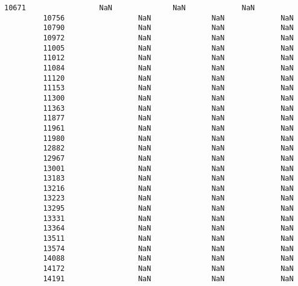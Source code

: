 \documentclass[11pt]{article}
\begin{document}
\begin{Verbatim}[commandchars=\\\{\}]
         10671                 NaN              NaN             NaN   
         10756                 NaN              NaN             NaN   
         10790                 NaN              NaN             NaN   
         10972                 NaN              NaN             NaN   
         11005                 NaN              NaN             NaN   
         11012                 NaN              NaN             NaN   
         11084                 NaN              NaN             NaN   
         11120                 NaN              NaN             NaN   
         11153                 NaN              NaN             NaN   
         11300                 NaN              NaN             NaN   
         11363                 NaN              NaN             NaN   
         11877                 NaN              NaN             NaN   
         11961                 NaN              NaN             NaN   
         11980                 NaN              NaN             NaN   
         12882                 NaN              NaN             NaN   
         12967                 NaN              NaN             NaN   
         13001                 NaN              NaN             NaN   
         13183                 NaN              NaN             NaN   
         13216                 NaN              NaN             NaN   
         13223                 NaN              NaN             NaN   
         13295                 NaN              NaN             NaN   
         13331                 NaN              NaN             NaN   
         13364                 NaN              NaN             NaN   
         13511                 NaN              NaN             NaN   
         13574                 NaN              NaN             NaN   
         14088                 NaN              NaN             NaN   
         14172                 NaN              NaN             NaN   
         14191                 NaN              NaN             NaN   
         

\end{Verbatim}
\end{document}
